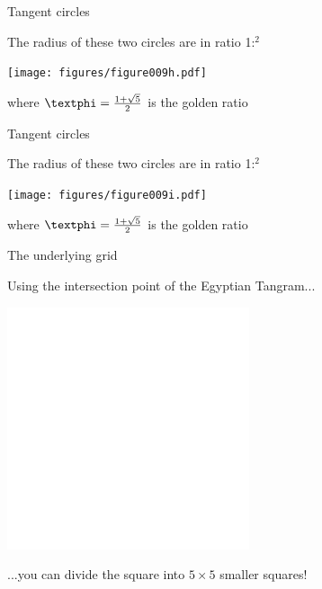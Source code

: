 \documentclass[14pt]{beamer}
\begin{document}

    \begin{frame}{Tangent circles}
        \begin{center}
            The radius of these two circles are in ratio 1:\textphi$^2$
        \end{center}\medskip
        \hspace{6.18em} \texttt{[image: figures/figure009h.pdf]} \\
        \begin{center}
             where $\text{\textphi} =\tfrac{1+\sqrt{5}}{2}$ is the golden ratio
        \end{center}
    \end{frame}


    \begin{frame}{Tangent circles}
        \begin{center}
            The radius of these two circles are in ratio 1:\textphi$^2$
        \end{center}\medskip
        \hspace{6.18em} \texttt{[image: figures/figure009i.pdf]} \\
        \begin{center}
             where $\text{\textphi} =\tfrac{1+\sqrt{5}}{2}$ is the golden ratio
        \end{center}
    \end{frame}


    \begin{frame}{The underlying grid}
        \begin{center}
            Using the intersection point of the Egyptian Tangram...
        \end{center}
        \hspace{6.18em} \includegraphics[scale=1.0]{figures/figure001f.pdf} \\
        \begin{center}
             ...you can divide the square into $5\!\times\!5$ smaller squares!
        \end{center}
    \end{frame}
\end{document}
